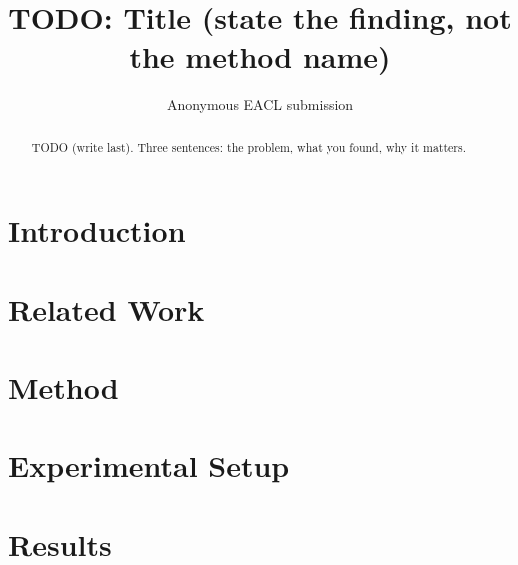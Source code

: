 \documentclass[11pt]{article}
\title{TODO: Title (state the finding, not the method name)}
\author{Anonymous EACL submission}
\begin{document}
\maketitle

\begin{abstract}
TODO (write last). Three sentences: the problem, what you found, why it matters.
\end{abstract}

\section{Introduction}

\section{Related Work}

\section{Method}

\section{Experimental Setup}

\section{Results}
\end{document}
